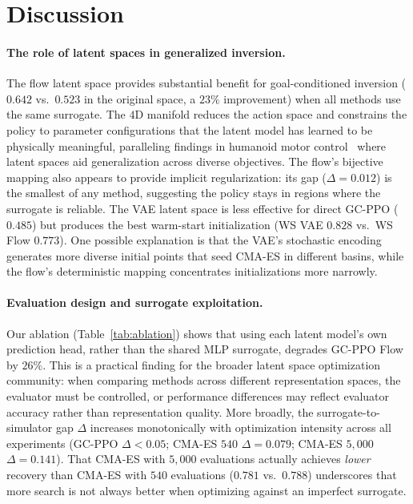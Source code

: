 \section{Discussion}
\label{sec:discussion}

\paragraph{The role of latent spaces in generalized inversion.}
The flow latent space provides substantial benefit for goal-conditioned inversion ($0.642$ vs.\ $0.523$ in the original space, a $23\%$ improvement) when all methods use the same surrogate. The $4$D manifold reduces the action space and constrains the policy to parameter configurations that the latent model has learned to be physically meaningful, paralleling findings in humanoid motor control~\cite{luo2024pulse} where latent spaces aid generalization across diverse objectives. The flow's bijective mapping also appears to provide implicit regularization: its gap ($\Delta{=}0.012$) is the smallest of any method, suggesting the policy stays in regions where the surrogate is reliable. The VAE latent space is less effective for direct GC-PPO ($0.485$) but produces the best warm-start initialization (WS VAE $0.828$ vs.\ WS Flow $0.773$). One possible explanation is that the VAE's stochastic encoding generates more diverse initial points that seed CMA-ES in different basins, while the flow's deterministic mapping concentrates initializations more narrowly.

\paragraph{Evaluation design and surrogate exploitation.}
Our ablation (Table~\ref{tab:ablation}) shows that using each latent model's own prediction head, rather than the shared MLP surrogate, degrades GC-PPO Flow by $26\%$. This is a practical finding for the broader latent space optimization community: when comparing methods across different representation spaces, the evaluator must be controlled, or performance differences may reflect evaluator accuracy rather than representation quality. More broadly, the surrogate-to-simulator gap $\Delta$ increases monotonically with optimization intensity across all experiments (GC-PPO $\Delta < 0.05$; CMA-ES $540$ $\Delta{=}0.079$; CMA-ES $5{,}000$ $\Delta{=}0.141$). That CMA-ES with $5{,}000$ evaluations actually achieves \emph{lower} recovery than CMA-ES with $540$ evaluations ($0.781$ vs.\ $0.788$) underscores that more search is not always better when optimizing against an imperfect surrogate.

